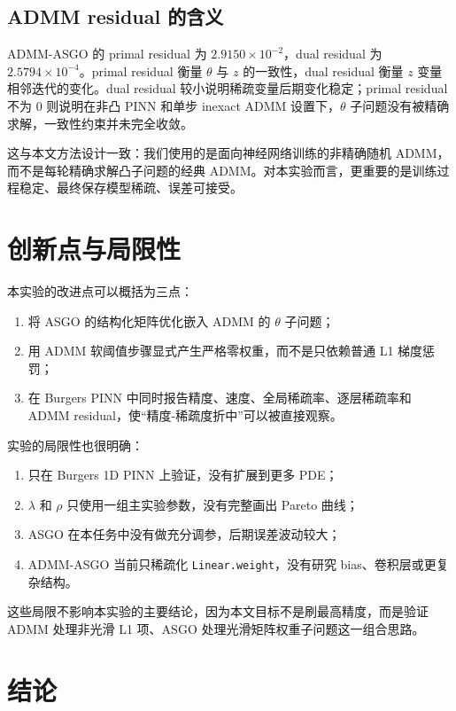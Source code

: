 \documentclass[UTF8,a4paper,12pt,fontset=none]{ctexart}
\begin{document}
\subsection{ADMM residual 的含义}

ADMM-ASGO 的 primal residual 为 $2.9150\times 10^{-2}$，dual residual 为 $2.5794\times 10^{-4}$。primal residual 衡量 $\theta$ 与 $z$ 的一致性，dual residual 衡量 $z$ 变量相邻迭代的变化。dual residual 较小说明稀疏变量后期变化稳定；primal residual 不为 0 则说明在非凸 PINN 和单步 inexact ADMM 设置下，$\theta$ 子问题没有被精确求解，一致性约束并未完全收敛。

这与本文方法设计一致：我们使用的是面向神经网络训练的非精确随机 ADMM，而不是每轮精确求解凸子问题的经典 ADMM。对本实验而言，更重要的是训练过程稳定、最终保存模型稀疏、误差可接受。

\section{创新点与局限性}

本实验的改进点可以概括为三点：

\begin{enumerate}
\item 将 ASGO 的结构化矩阵优化嵌入 ADMM 的 $\theta$ 子问题；
\item 用 ADMM 软阈值步骤显式产生严格零权重，而不是只依赖普通 L1 梯度惩罚；
\item 在 Burgers PINN 中同时报告精度、速度、全局稀疏率、逐层稀疏率和 ADMM residual，使“精度-稀疏度折中”可以被直接观察。
\end{enumerate}

实验的局限性也很明确：

\begin{enumerate}
\item 只在 Burgers 1D PINN 上验证，没有扩展到更多 PDE；
\item $\lambda$ 和 $\rho$ 只使用一组主实验参数，没有完整画出 Pareto 曲线；
\item ASGO 在本任务中没有做充分调参，后期误差波动较大；
\item ADMM-ASGO 当前只稀疏化 \texttt{Linear.weight}，没有研究 bias、卷积层或更复杂结构。
\end{enumerate}

这些局限不影响本实验的主要结论，因为本文目标不是刷最高精度，而是验证 ADMM 处理非光滑 L1 项、ASGO 处理光滑矩阵权重子问题这一组合思路。

\section{结论}
\end{document}
